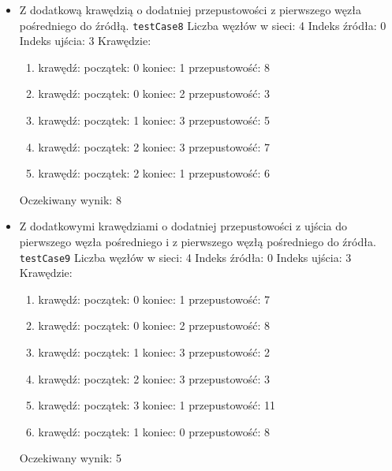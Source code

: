 \begin{itemize}[nosep]
    \item Z dodatkową krawędzią o dodatniej przepustowości z pierwszego węzła
    pośredniego do źródłą.
    \texttt{testCase8}
    Liczba węzłów w sieci: 4
    Indeks źródła: 0
    Indeks ujścia: 3
    Krawędzie:
    \begin{enumerate}[nosep]
        \item krawędź:
        początek: 0
        koniec: 1
        przepustowość: 8
        \item krawędź:
        początek: 0
        koniec: 2
        przepustowość: 3
        \item krawędź:
        początek: 1
        koniec: 3
        przepustowość: 5
        \item krawędź:
        początek: 2
        koniec: 3
        przepustowość: 7
        \item krawędź:
        początek: 2
        koniec: 1
        przepustowość: 6
    \end{enumerate}
    Oczekiwany wynik: 8

    \item Z dodatkowymi krawędziami o dodatniej przepustowości z ujścia do
    pierwszego węzła pośredniego i z pierwszego węzłą pośredniego do źródła.
    \texttt{testCase9}
    Liczba węzłów w sieci: 4
    Indeks źródła: 0
    Indeks ujścia: 3
    Krawędzie:
    \begin{enumerate}[nosep]
        \item krawędź:
        początek: 0
        koniec: 1
        przepustowość: 7
        \item krawędź:
        początek: 0
        koniec: 2
        przepustowość: 8
        \item krawędź:
        początek: 1
        koniec: 3
        przepustowość: 2
        \item krawędź:
        początek: 2
        koniec: 3
        przepustowość: 3
        \item krawędź:
        początek: 3
        koniec: 1
        przepustowość: 11
        \item krawędź:
        początek: 1
        koniec: 0
        przepustowość: 8
    \end{enumerate}
    Oczekiwany wynik: 5
\end{itemize}


